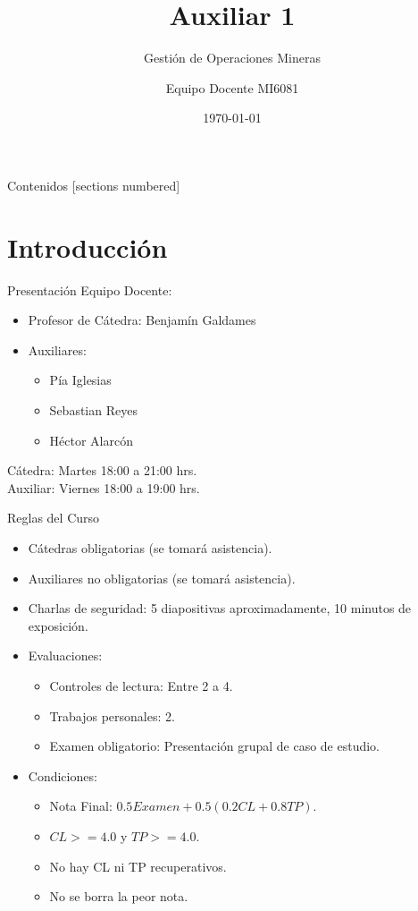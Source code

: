\documentclass[10pt]{beamer}
\title{Auxiliar 1}
\subtitle{Gestión de Operaciones Mineras}
\date{\today}
\author{Equipo Docente MI6081}
\institute{Universidad de Chile - FCFM}
\begin{document}
\maketitle

\begin{frame}[allowframebreaks]{Contenidos}
  [sections numbered]
  \tableofcontents[hideallsubsections]
\end{frame}

\section{Introducción}

\begin{frame}[fragile]{Presentación}
Equipo Docente:
\begin{itemize}
    \item Profesor de Cátedra: Benjamín Galdames
    \item Auxiliares:
    \begin{itemize}
        \item Pía Iglesias
        \item Sebastian Reyes
        \item Héctor Alarcón
    \end{itemize}
\end{itemize}
Cátedra: Martes 18:00 a 21:00 hrs.\\
Auxiliar: Viernes 18:00 a 19:00 hrs.
\end{frame}

\begin{frame}[fragile]{Reglas del Curso}
\begin{itemize}
    \item Cátedras obligatorias (se tomará asistencia).
    \item Auxiliares no obligatorias (se tomará asistencia).
    \item Charlas de seguridad: 5 diapositivas aproximadamente, 10 minutos de exposición.
    \item Evaluaciones:
    \begin{itemize}
        \item Controles de lectura: Entre 2 a 4.
        \item Trabajos personales: 2.
        \item Examen obligatorio: Presentación grupal de caso de estudio.
    \end{itemize}
    \item Condiciones:
    \begin{itemize}
        \item Nota Final: $0.5Examen+0.5(0.2CL+0.8TP)$.
        \item $CL>=4.0$ y $TP>=4.0$.
        \item No hay CL ni TP recuperativos.
        \item No se borra la peor nota.
    \end{itemize}
\end{itemize}
\end{frame}
\end{document}
